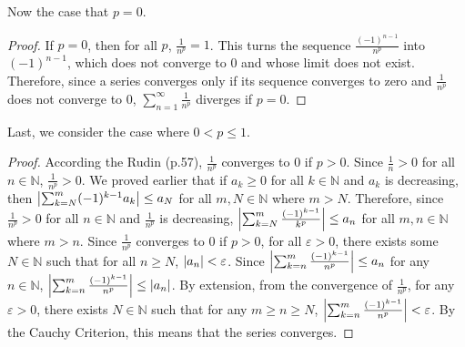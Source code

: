 \documentclass[11pt]{article}
\begin{document}
        Now the case that $p = 0$.
        \begin{proof}
            If $p = 0$, then for all $p$, $\frac{1}{n^p} = 1$.
            This turns the sequence $\frac{(-1)^{n - 1}}{n^p}$ into $(-1)^{n - 1}$, which does not converge to $0$ and whose limit does not exist.
            Therefore, since a series converges only if its sequence converges to zero and $\frac{1}{n^p}$ does not converge to $0$, $\sum_{n = 1}^{\infty} \frac{1}{n^p}$ diverges if $p = 0$.
        \end{proof}

        Last, we consider the case where $0 < p \leq 1$.
        \begin{proof}
            According the Rudin (p.57), $\frac{1}{n^p}$ converges to $0$ if $p > 0$.
            Since $\frac{1}{n} > 0$ for all $n \in \mathbb{N}$, $\frac{1}{n^p} > 0$.
            We proved earlier that if $a_k \geq 0$ for all $k \in \mathbb{N}$ and $a_k$ is decreasing, then $\left| \sum_{k = N}^{m} (-1)^{k-1} a_k \right| \leq a_N$ for all $m,N \in \mathbb{N}$ where $m > N$.
            Therefore, since $\frac{1}{n^p} > 0$ for all $n \in \mathbb{N}$ and $\frac{1}{n^p}$ is decreasing, $\left| \sum_{k = N}^{m} \frac{(-1)^{k-1}}{k^p} \right| \leq a_n$ for all $m,n \in \mathbb{N}$ where $m > n$.
            Since $\frac{1}{n^p}$ converges to $0$ if $p > 0$, for all $\varepsilon > 0$, there exists some $N \in \mathbb{N}$ such that for all $n \geq N$, $\left| a_n \right| < \varepsilon$.
            Since $\left| \sum_{k = n}^{m} \frac{(-1)^{k-1}}{n^p} \right| \leq a_n$ for any $n \in \mathbb{N}$, $\left| \sum_{k = n}^{m} \frac{(-1)^{k-1}}{n^p} \right| \leq \left| a_n \right|$. 
            By extension, from the convergence of $\frac{1}{n^p}$, for any $\varepsilon > 0$, there exists $N \in \mathbb{N}$ such that for any $m \geq n \geq N$, $\left| \sum_{k = n}^{m} \frac{(-1)^{k-1}}{n^p} \right| < \varepsilon$.
            By the Cauchy Criterion, this means that the series converges.
        \end{proof}

\pagebreak
\end{document}
